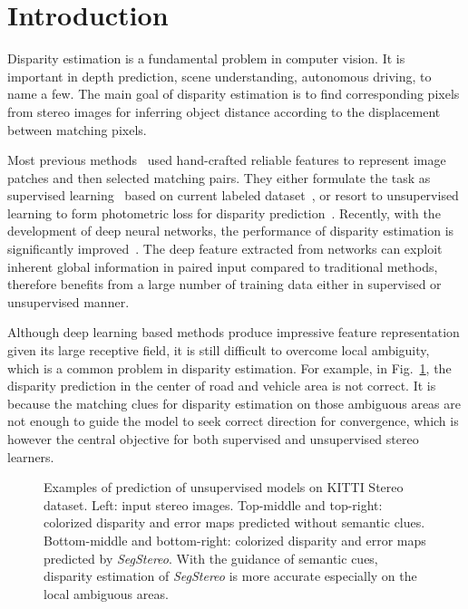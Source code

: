 \documentclass[runningheads]{llncs}
\begin{document}
\section{Introduction}\label{sec:introduction}
Disparity estimation is a fundamental problem in computer vision. It is important in depth prediction, scene understanding, autonomous driving, to name a few. The main goal of disparity estimation is to find corresponding pixels from stereo images for inferring object distance according to the displacement between matching pixels.

Most previous methods~\cite{geiger2010efficient,brown2011discriminative,chen2015semantic,revaud2016deepmatching} used hand-crafted reliable features to represent image patches and then selected matching pairs. They either formulate the task as supervised learning~\cite{kong2004method,hirschmuller2009evaluation} based on current labeled dataset~\cite{Geiger2012CVPR,yamaguchi2014efficient}, or resort to unsupervised learning to form photometric loss for disparity prediction~\cite{garg2016unsupervised,monodepth17}. Recently, with the development of deep neural networks, the performance of disparity estimation is significantly improved~\cite{zbontar2016stereo}. The deep feature extracted from networks can exploit inherent global information in paired input compared to traditional methods, therefore benefits from a large number of training data either in supervised or unsupervised manner.

Although deep learning based methods produce impressive feature representation given its large receptive field, it is still difficult to overcome local ambiguity, which is a common problem in disparity estimation. For example, in Fig.~\ref{fig:overview_results}, the disparity prediction in the center of road and vehicle area is not correct. It is because the matching clues for disparity estimation on those ambiguous areas are not enough to guide the model to seek correct direction for convergence, which is however the central objective for both supervised and unsupervised stereo learners.

\begin{figure}[t]
  \centering
  \caption{Examples of prediction of unsupervised models on KITTI Stereo dataset. Left: input stereo images. Top-middle and top-right: colorized disparity and error maps predicted without semantic clues. Bottom-middle and bottom-right: colorized disparity and error maps predicted by \emph{SegStereo}. With the guidance of semantic cues, disparity estimation of \emph{SegStereo} is more accurate especially on the local ambiguous areas.}
  \label{fig:overview_results}
\end{figure}
\end{document}
